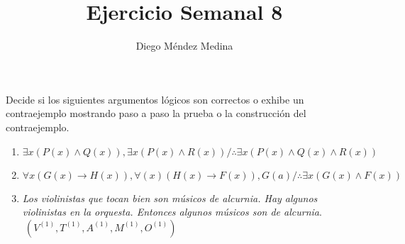 \documentclass[8pt, letterpaper]{article}
\title{%
  Ejercicio Semanal 8\\
  {\large{}}}
\author{Diego Méndez Medina}
\date{}
\begin{document}
\ttfamily
\maketitle
\rmfamily

Decide si los siguientes argumentos lógicos son correctos o exhibe un
contraejemplo mostrando paso a paso la prueba o la construcción del
contraejemplo.
\begin{enumerate}
\item $\exists x(P(x)\land Q(x)), \exists x(P(x)\land R(x)) /
  \therefore \exists x(P(x)\land Q(x) \land R(x))$

\item $\forall x(G(x)\rightarrow H(x)), \forall(x)(H(x)\rightarrow F(x)),
  G(a)/\therefore \exists x(G(x) \land F(x))$
  
  
\item \textit{Los violinistas que tocan bien son músicos de alcurnia. Hay
  algunos violinistas en la orquesta. Entonces algunos músicos son de
  alcurnia}.\rmfamily $\ (V^{(1)}, T^{(1)}, A^{(1)}, M^{(1)}, O^{(1)})$
  
\end{enumerate}
\end{document}
